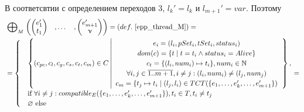 В соответсвтии с определением переходов 3, %
$l_k' = l_k$ и $l_{m+1}' = var$. Поэтому
\begin{align}
& \mathrel{\bigoplus}_M
\begin{pmatrix}
\begin{pmatrix}
e_1' \\
t_1 
\end{pmatrix}& ,
\dots& ,
\begin{pmatrix}
e_{m+1}' \\
\upnu 
\end{pmatrix}
\end{pmatrix} = (def.~\ref{epp_thread_M}) = \nonumber \\
& = \begin{cases}
& \left\lbrace (c_{pc},c_l,c_g,c_s,c_t, c_m) \in C 
\left| 
\begin{array}{c}
e_i = (l_i, pSet_i, tSet_i, status_i) \\
dom(c) = \{t \mid t = t_i \land status_i = Alive\}\\
c_t = \{(l_i, num_i) \mapsto t_i\}, num_i \in \mathbb{N} \\
\forall i, j \in \overline{1..m+1}, i \neq j: (l_i, num_i) \neq (l_j, num_j)\\
c_m = \{ t_j \mapsto t_i \mid (l_j, l_i) \in TCT(\{e_1, \dots, e_k', \dots, e_{m+1}'\}) \\
\end{array}
\right.
\right\rbrace, \\
& \mbox{if } \forall i \neq j: compatible_{E}(\{e_1, \dots, e_k', \dots, e_{m+1}'\}), t_i \in T, t_i \neq t_j \\
& \varnothing \mbox{ else}
\end{cases} = \nonumber
\end{align}

